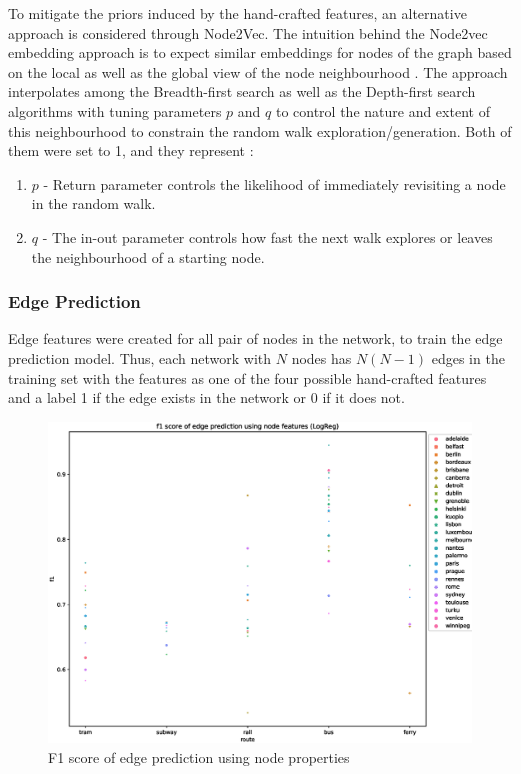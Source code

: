 \documentclass{article}
\theoremstyle{plain}
\theoremstyle{definition}
\theoremstyle{remark}
\begin{document}
To mitigate the priors induced by the hand-crafted features, an alternative approach is considered through Node2Vec. The intuition behind the Node2vec embedding approach is to expect similar embeddings for nodes of the graph based on the local as well as the global view of the node neighbourhood \cite{grover2016node2vec}. The approach interpolates among the Breadth-first search as well as the Depth-first search algorithms with tuning parameters $p$ and $q$ to control the nature and extent of this neighbourhood to constrain the random walk exploration/generation. Both of them were set to 1, and they represent \cite{grover2016node2vec}:
\begin{enumerate}
    \item $p$ - Return parameter controls the likelihood of immediately revisiting a node in the random walk.
    \item $q$ - The in-out parameter controls how fast the next walk explores or leaves the neighbourhood of a starting node.
\end{enumerate}

\subsubsection{Edge Prediction}
\label{edge-pred}
Edge features were created for all pair of nodes in the network, to train the edge prediction model. Thus, each network with $N$ nodes has $N(N-1)$ edges in the training set with the features as one of the four possible hand-crafted features and a label 1 if the edge exists in the network or 0 if it does not. 

\begin{figure}[ht]
\vskip -0.1in
\begin{center}
\centerline{\includegraphics[width=\columnwidth]{images/edge-pred-node.eps}}
\caption{F1 score of edge prediction using node properties}
\label{edge-pred-node_fig}
\end{center}
\vskip -0.3in
\end{figure}
\end{document}
